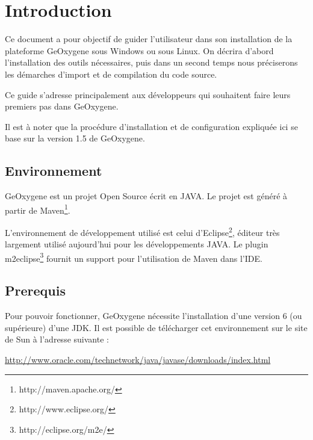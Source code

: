 \chapter{Introduction}

Ce document a pour objectif de guider l'utilisateur dans son installation de la plateforme GeOxygene sous Windows ou sous Linux. On décrira d'abord l'installation des outils nécessaires, puis dans un second temps nous préciserons les démarches d'import et de compilation du code source. 

\bigskip

Ce guide s'adresse principalement aux développeurs qui souhaitent faire leurs premiers pas dans GeOxygene.

\bigskip

Il est à noter que la procédure d'installation et de configuration expliquée ici se base sur la version 1.5 de GeOxygene.

\section{Environnement}

GeOxygene est un projet Open Source écrit en JAVA. Le projet est généré à partir de Maven\footnote{http://maven.apache.org/}. 

\bigskip

L'environnement de développement utilisé est celui d'Eclipse\footnote{http://www.eclipse.org/}, éditeur très largement utilisé aujourd'hui pour les développements JAVA. Le plugin m2eclipse\footnote{http://eclipse.org/m2e/} fournit un support pour l'utilisation de Maven dans l'IDE.


\section{Prerequis}

Pour pouvoir fonctionner, GeOxygene nécessite l'installation d'une version 6 (ou supérieure) d'une JDK. Il est possible de télécharger cet environnement sur le site de Sun à l'adresse suivante :

\medskip

\href{http://www.oracle.com/technetwork/java/javase/downloads/index.html}{http://www.oracle.com/technetwork/java/javase/downloads/index.html}
